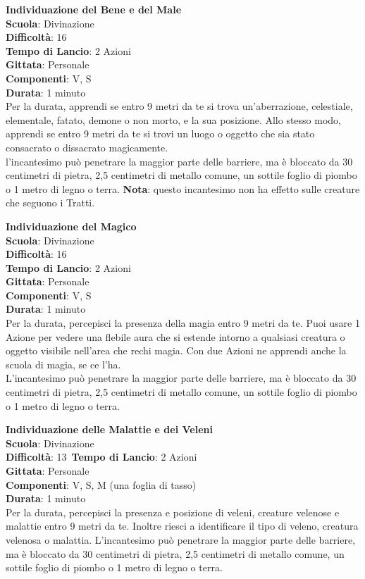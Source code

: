 \begin{multicols}{2}
\medskip\textbf{Individuazione del Bene e del Male}\\
\textbf{Scuola}: Divinazione\\
\textbf{Difficoltà}: 16\\
\textbf{Tempo di Lancio}: 2 Azioni\\
\textbf{Gittata}: Personale\\
\textbf{Componenti}: V, S\\
\textbf{Durata}: 1 minuto\\
Per la durata, apprendi se entro 9 metri da te si trova un'aberrazione, celestiale, elementale, fatato, demone o non morto, e la sua posizione. Allo stesso modo, apprendi se entro 9 metri da te si trovi un luogo o oggetto che sia stato consacrato o dissacrato magicamente.\\
l'incantesimo può penetrare la maggior parte delle barriere, ma è bloccato da 30 centimetri di pietra, 2,5 centimetri di metallo comune, un sottile foglio di piombo o 1 metro di legno o terra. 
\textbf{Nota}: questo incantesimo non ha effetto sulle creature che seguono i Tratti.

\medskip\textbf{Individuazione del Magico}\\
\textbf{Scuola}: Divinazione\\
\textbf{Difficoltà}: 16\\
\textbf{Tempo di Lancio}: 2 Azioni\\
\textbf{Gittata}: Personale\\
\textbf{Componenti}: V, S\\
\textbf{Durata}: 1 minuto\\
Per la durata, percepisci la presenza della magia entro 9 metri da te. Puoi usare 1 Azione per vedere una flebile aura che si estende intorno a qualsiasi creatura o oggetto visibile nell'area che rechi magia. Con due Azioni ne apprendi anche la scuola di magia, se ce l'ha.\\
L'incantesimo può penetrare la maggior parte delle barriere, ma è bloccato da 30 centimetri di pietra, 2,5 centimetri di metallo comune, un sottile foglio di piombo o 1 metro di legno o terra.

\medskip\textbf{Individuazione delle Malattie e dei Veleni}\\
\textbf{Scuola}: Divinazione\\
\textbf{Difficoltà}: 13\
\textbf{Tempo di Lancio}: 2 Azioni\\
\textbf{Gittata}: Personale\\
\textbf{Componenti}: V, S, M (una foglia di tasso)\\
\textbf{Durata}: 1 minuto\\
Per la durata, percepisci la presenza e posizione di veleni, creature velenose e malattie entro 9 metri da te. Inoltre riesci a identificare il tipo di veleno, creatura velenosa o malattia. L'incantesimo può penetrare la maggior parte delle barriere, ma è bloccato da 30 centimetri di pietra, 2,5 centimetri di metallo comune, un sottile foglio di piombo o 1 metro di legno o terra.


\end{multicols}
